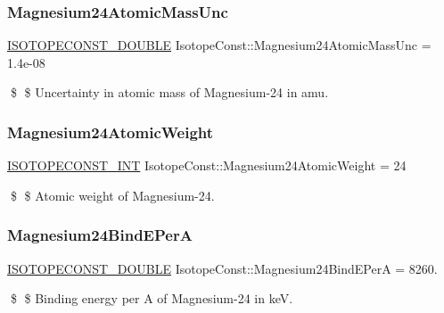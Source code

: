 \subsubsection{\texorpdfstring{Magnesium24\+Atomic\+Mass\+Unc}{Magnesium24AtomicMassUnc}}
{\footnotesize\ttfamily \mbox{\hyperlink{group___isotope_const-_macros_ga8f45a7272ce02c0b4c65c44636ed719a}{I\+S\+O\+T\+O\+P\+E\+C\+O\+N\+S\+T\+\_\+\+D\+O\+U\+B\+LE}} Isotope\+Const\+::\+Magnesium24\+Atomic\+Mass\+Unc = 1.\+4e-\/08}

\$ \$ Uncertainty in atomic mass of Magnesium-\/24 in amu. \mbox{\label{group___isotope_const-_magnesium-_mg24_ga11e616b03d38bb11561084c6d6368569}} 
\subsubsection{\texorpdfstring{Magnesium24\+Atomic\+Weight}{Magnesium24AtomicWeight}}
{\footnotesize\ttfamily \mbox{\hyperlink{group___isotope_const-_macros_ga5f18360b3e99483a35c32d789e62621c}{I\+S\+O\+T\+O\+P\+E\+C\+O\+N\+S\+T\+\_\+\+I\+NT}} Isotope\+Const\+::\+Magnesium24\+Atomic\+Weight = 24}

\$ \$ Atomic weight of Magnesium-\/24. \mbox{\label{group___isotope_const-_magnesium-_mg24_gae60ed68de49c36f76976b30f473c9a19}} 
\subsubsection{\texorpdfstring{Magnesium24\+Bind\+E\+PerA}{Magnesium24BindEPerA}}
{\footnotesize\ttfamily \mbox{\hyperlink{group___isotope_const-_macros_ga8f45a7272ce02c0b4c65c44636ed719a}{I\+S\+O\+T\+O\+P\+E\+C\+O\+N\+S\+T\+\_\+\+D\+O\+U\+B\+LE}} Isotope\+Const\+::\+Magnesium24\+Bind\+E\+PerA = 8260.}

\$ \$ Binding energy per A of Magnesium-\/24 in keV. \mbox{\label{group___isotope_const-_magnesium-_mg24_gae2baf9e71dfac60b30c687ca775d7059}} 
